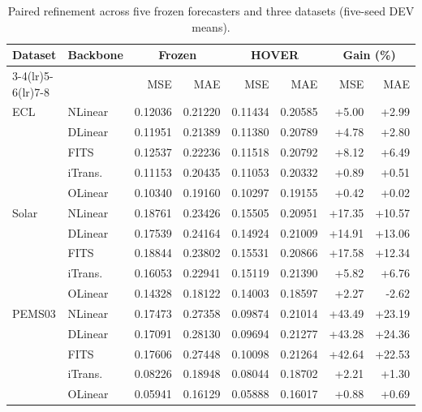 \begin{table}[t]
\caption{Paired refinement across five frozen forecasters and three datasets (five-seed DEV means).}
\label{tab:cross}
\centering
\begingroup
\setlength{\tabcolsep}{0.9pt}
\renewcommand{\arraystretch}{1.20}
\fontsize{7.2}{8.6}\selectfont
\begin{tabular*}{\columnwidth}{@{\extracolsep{\fill}}ll|rr|rr|rr@{}}
\toprule
\multirow{2}{*}{Dataset} & \multirow{2}{*}{Backbone} & \multicolumn{2}{c|}{Frozen} & \multicolumn{2}{c|}{HOVER} & \multicolumn{2}{c}{Gain (\%)} \\
\cmidrule(lr){3-4}\cmidrule(lr){5-6}\cmidrule(lr){7-8}
 &  & MSE & MAE & MSE & MAE & MSE & MAE \\
\midrule
ECL & NLinear & 0.12036 & 0.21220 & 0.11434 & 0.20585 & +5.00 & +2.99 \\
 & DLinear & 0.11951 & 0.21389 & 0.11380 & 0.20789 & +4.78 & +2.80 \\
 & FITS & 0.12537 & 0.22236 & 0.11518 & 0.20792 & +8.12 & +6.49 \\
 & iTrans. & 0.11153 & 0.20435 & 0.11053 & 0.20332 & +0.89 & +0.51 \\
 & OLinear & 0.10340 & 0.19160 & 0.10297 & 0.19155 & +0.42 & +0.02 \\
\midrule
Solar & NLinear & 0.18761 & 0.23426 & 0.15505 & 0.20951 & +17.35 & +10.57 \\
 & DLinear & 0.17539 & 0.24164 & 0.14924 & 0.21009 & +14.91 & +13.06 \\
 & FITS & 0.18844 & 0.23802 & 0.15531 & 0.20866 & +17.58 & +12.34 \\
 & iTrans. & 0.16053 & 0.22941 & 0.15119 & 0.21390 & +5.82 & +6.76 \\
 & OLinear & 0.14328 & 0.18122 & 0.14003 & 0.18597 & +2.27 & -2.62 \\
\midrule
PEMS03 & NLinear & 0.17473 & 0.27358 & 0.09874 & 0.21014 & +43.49 & +23.19 \\
 & DLinear & 0.17091 & 0.28130 & 0.09694 & 0.21277 & +43.28 & +24.36 \\
 & FITS & 0.17606 & 0.27448 & 0.10098 & 0.21264 & +42.64 & +22.53 \\
 & iTrans. & 0.08226 & 0.18948 & 0.08044 & 0.18702 & +2.21 & +1.30 \\
 & OLinear & 0.05941 & 0.16129 & 0.05888 & 0.16017 & +0.88 & +0.69 \\
\bottomrule
\end{tabular*}
\endgroup
\end{table}
